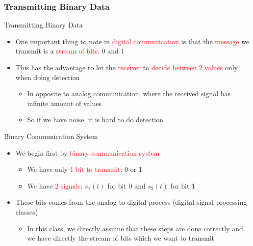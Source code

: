 \documentclass{Beamer}
\begin{document}
\subsubsection{Transmitting Binary Data}
\begin{frame}[t,allowframebreaks]{Transmitting Binary Data}

\begin{itemize}

\item One important thing to note in \textcolor{red}{digital communication} is that the \textcolor{red}{message} we transmit is a \textcolor{red}{stream of bits}: 0 and 1

\item This has the advantage to let the \textcolor{red}{receiver} to \textcolor{red}{decide between 2 values} only when doing detection

	\begin{itemize}
	\item In opposite to analog communication, where the received signal has infinite amount of values
	
	\item So if we have noise, it is hard to do detection
	\end{itemize}


\end{itemize}

\end{frame}


\begin{frame}[t]{Binary Communication System}

\begin{itemize}

\item We begin first by \textcolor{red}{binary communication system}

	\begin{itemize}
	
	\item We have only \textcolor{red}{1 bit to transmit}: 0 or 1	
	
	\item We have \textcolor{red}{2 signals}: $s_1(t)$ for bit 0 and $s_2(t)$ for bit 1
	\end{itemize}

\item These bits comes from the analog to digital process (digital signal processing classes)

	\begin{itemize}
	\item In this class, we directly assume that these steps are done correctly and we have directly the stream of bits which we want to transmit
	\end{itemize}

\end{itemize}


\end{frame}
\end{document}
